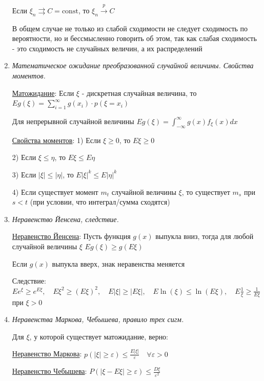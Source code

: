 \documentclass[12pt]{article}
\begin{document}
\begin{enumerate}
    \Ths Если $\xi_n \rightrightarrows C = \mathrm{const}$, то $\xi_n \overset{p}{\longrightarrow} C$

    \Nota В общем случае не только из слабой сходимости не следует сходимость по вероятности, но и бессмысленно говорить
    об этом, так как слабая сходимость - это сходимость не случайных величин, а их распределений

    \item \textit{Математическое ожидание преобразованной случайной величины. Свойства моментов.}
    
    \hyperlink{expectedvalueoftransformedvariable}{Матожидание}: \Ths Если $\xi$ - дискретная случайная величина, то $Eg(\xi) = \sum_{i = 1}^\infty g(x_i) \cdot p(\xi = x_i)$

    Для непрерывной случайной величины $Eg(\xi) = \int_{-\infty}^{\infty} g(x) f_\xi(x) dx$

    \hyperlink{momentsproperties}{Свойства моментов}: 1) Если $\xi \geq 0$, то $E\xi \geq 0$

    2) Если $\xi \leq \eta$, то $E\xi \leq E\eta$

    3) Если $|\xi| \leq |\eta|$, то $E|\xi|^k \leq E|\eta|^k$

    4) Если существует момент $m_t$ случайной величины $\xi$, то существует $m_s$ при $s < t$ (при условии, что интеграл/сумма сходятся)

    
    \item \textit{Неравенство Йенсена, следствие.}

    \hyperlink{jensensinequality}{Неравенство Йенсена}: \Ths Пусть функция $g(x)$ выпукла вниз, тогда для любой случайной величины $\xi$ $Eg(\xi) \geq g(E\xi)$

    \Nota Если $g(x)$ выпукла вверх, знак неравенства меняется

    Следствие: $Ee^\xi \geq e^{E\xi}, \quad E\xi^2 \geq (E\xi)^2, \quad E|\xi| \geq |E\xi|, \quad E\ln(\xi) \leq \ln(E\xi), \quad E\frac{1}{\xi} \geq \frac{1}{E\xi}$ при $\xi > 0$

    \item \textit{Неравенства Маркова, Чебышева, правило трех сигм.}

    Для $\xi$, у которой существует матожидание, верно: 

    \hyperlink{markovsinequality}{Неравенство Маркова}: \Ths $p(|\xi| \geq \varepsilon) \leq \frac{E|\xi|}{\varepsilon} \quad \forall \varepsilon > 0$
    
    \hyperlink{chebyshevsinequality}{Неравенство Чебышева}: \Ths $P(|\xi - E\xi| \geq \varepsilon) \leq \frac{D\xi}{\varepsilon^2}$
    

\end{enumerate}
\end{document}
